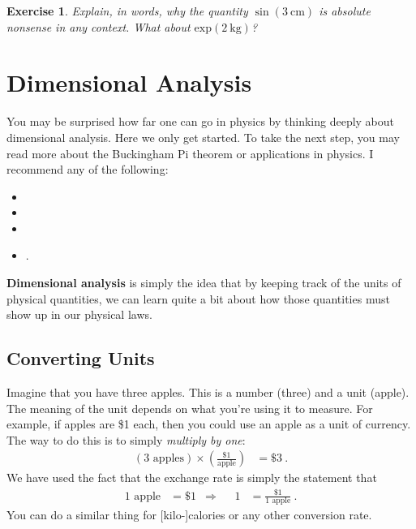 \documentclass[
  11pt,
	colorful,
	raggedright,
]{tufte-style-thesis-flip}
\newtheorem{exercise}{Exercise}[section]
\begin{document}
\begin{exercise}
Explain, in words, why the quantity $\sin(3~\text{cm})$ is absolute nonsense in any context. What about $\text{exp}(2~\text{kg})$?
\end{exercise}

\chapter{Dimensional Analysis}

You may be surprised how far one can go in physics by thinking deeply about dimensional analysis. Here we only get started. To take the next step, you may read more about the Buckingham Pi theorem or applications in physics. I recommend any of the following:
\begin{itemize}
  \item {}
  \item {}
  \item {}
  \item {}.
\end{itemize}
\textbf{Dimensional analysis} is simply the idea that by keeping track of the units of physical quantities, we can learn quite a bit about how those quantities must show up in our physical laws.


\section{Converting Units}

Imagine that you have three apples. This is a number (three) and a unit (apple). The meaning of the unit depends on what you're using it to measure. For example, if apples are \$1 each, then you could use an apple as a unit of currency. The way to do this is to simply \emph{multiply by one}:
\begin{align}
  (3\text{ apples}) \times \left(\frac{\text{\$ 1}}{\text{apple}}\right)
  &= \$ 3 \ .
\end{align}
We have used the fact that the exchange rate is simply the statement that
\begin{align}
  1\text{ apple} &= \$1
  & \Rightarrow &&
  1 &= \frac{\$ 1}{1\text{ apple}} \ .
\end{align}
You can do a similar thing for [kilo-]calories or any other conversion rate. 
\end{document}
